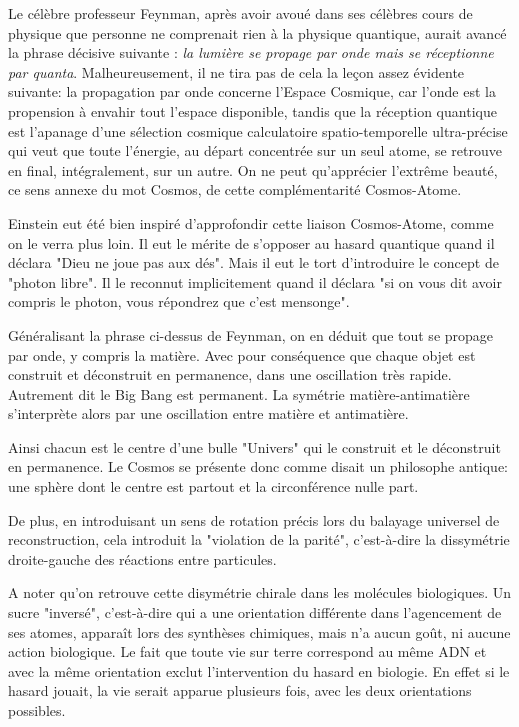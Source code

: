 \documentclass[a4paper,12pt]{article}
\begin{document}
Le célèbre professeur Feynman, après avoir avoué dans ses célèbres cours de physique que personne ne comprenait rien à la physique quantique, aurait avancé la phrase décisive suivante : \textit{la lumière se propage par onde mais se réceptionne par quanta}. Malheureusement, il ne tira pas de cela la leçon assez évidente suivante: la propagation par onde concerne l'Espace Cosmique, car l'onde est la propension à envahir tout l'espace disponible, tandis que la réception quantique est l'apanage d'une sélection cosmique calculatoire spatio-temporelle ultra-précise qui veut que toute l'énergie, au départ concentrée sur un seul atome, se retrouve en final, intégralement, sur un autre. On ne peut qu'apprécier l'extrême beauté, ce sens annexe du mot Cosmos, de cette complémentarité Cosmos-Atome. 

Einstein eut été bien inspiré d'approfondir cette liaison Cosmos-Atome, comme on le verra plus loin. Il eut le mérite de s'opposer au hasard quantique quand il déclara "Dieu ne joue pas aux dés". Mais il eut le tort d'introduire le concept de "photon libre". Il le reconnut implicitement quand il déclara "si on vous dit avoir compris le photon, vous répondrez que c'est mensonge".

Généralisant la phrase ci-dessus de Feynman, on en déduit que tout se propage par onde, y compris la matière. Avec pour conséquence que chaque objet est construit et déconstruit en permanence, dans une oscillation très rapide. Autrement dit le Big Bang est permanent. La symétrie matière-antimatière s'interprète alors par une oscillation entre matière et antimatière. 

Ainsi chacun est le centre d'une bulle "Univers" qui le construit et le déconstruit en permanence. Le Cosmos se présente donc comme disait un philosophe antique: une sphère dont le centre est partout et la circonférence nulle part.

De plus, en introduisant un sens de rotation précis lors du balayage universel de reconstruction, cela introduit la "violation de la parité", c'est-à-dire la dissymétrie droite-gauche des réactions entre particules. 

A noter qu'on retrouve cette disymétrie chirale dans les molécules biologiques. Un sucre "inversé", c'est-à-dire qui a une orientation différente dans l'agencement de ses atomes, apparaît lors des synthèses chimiques, mais n'a aucun goût, ni aucune action biologique. Le fait que toute vie sur terre correspond au même ADN et avec la même orientation exclut l'intervention du hasard en biologie. En effet si le hasard jouait, la vie serait apparue plusieurs fois, avec les deux orientations possibles.
\end{document}
